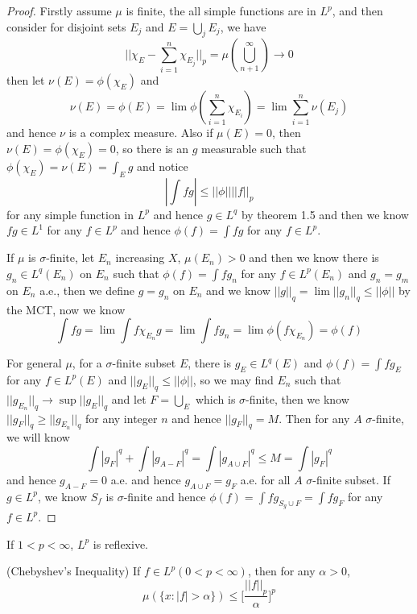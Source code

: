 \documentclass[lang=en, color=blue, ]{elegantbook}
\begin{document}
\begin{proof}\par
    Firstly assume $\mu$ is finite, the all simple functions are in $L^p$, and then consider for disjoint sets $E_j$ and $E = \bigcup_j E_j$, we have
    \[
    ||\chi_E - \sum\limits_{i=1}^n\chi_{E_j}||_p = \mu(\bigcup_{n+1}^{\infty}) \to 0
    \]
    then let $\nu(E) = \phi(\chi_E)$ and
    \[\nu(E) = \phi(E) = \lim \phi(\sum\limits_{i=1}^n \chi_{E_i}) = \lim \sum\limits_{i=1}^n \nu(E_j)\]
    and hence $\nu$ is a complex measure. Also if $\mu(E) = 0$, then $\nu(E) = \phi(\chi_E) = 0$, so there is an $g$ measurable such that $\phi(\chi_E) = \nu(E) = \int_E g$ and notice
    \[
    |\int fg| \leq ||\phi||||f||_p
    \]
    for any simple function in $L^p$ and hence $g\in L^q$ by theorem 1.5 and then we know $fg \in L^1$ for any $f\in L^p$ and hence $\phi(f) = \int fg$ for any $f\in L^p$.\par
    If $\mu$ is $\sigma$-finite, let $E_n$ increasing $X$, $\mu(E_n) > 0$ and then we know there is $g_n \in L^q(E_n)$ on $E_n$ such that $\phi(f) = \int fg_n$ for any $f\in L^p(E_n)$ and $g_n = g_m$ on $E_n$ a.e., then we define $g= g_n$ on $E_n$ and we know $||g||_q = \lim ||g_n||_q \leq ||\phi||$ by the MCT, now we know
    \[
    \int fg = \lim \int f\chi_{E_n}g = \lim \int fg_n = \lim \phi(f\chi_{E_n}) = \phi(f)
    \]\par
    For general $\mu$, for a $\sigma$-finite subset $E$, there is $g_E\in L^q(E)$ and $\phi(f) = \int fg_E$ for any $f\in L^p(E)$ and $||g_E||_q \leq ||\phi||$, so we may find $E_n$ such that $||g_{E_n}||_q \to \sup||g_E||_q$ and let $F = \bigcup_E$ which is $\sigma$-finite, then we know $||g_F||_q \geq ||g_{E_n}||_q$ for any integer $n$ and hence $||g_F||_q = M$. Then for any $A$ $\sigma$-finite, we will know
    \[
    \int |g_F|^q + \int |g_{A-F}|^q = \int |g_{A\cup F}|^q \leq M = \int |g_F|^q
    \]
    and hence $g_{A-F} = 0$ a.e. and hence $g_{A\cup F} = g_F$ a.e. for all $A$ $\sigma$-finite subset. If $g\in L^p$, we know $S_f$ is $\sigma$-finite and hence $\phi(f) = \int fg_{S_g\cup F} = \int f g_F$ for any $f\in L^p$.
\end{proof}

\begin{corollary}
    If $1 < p < \infty$, $L^p$ is reflexive.
\end{corollary}

\begin{theorem}
    (Chebyshev's Inequality) If $f\in L^p(0<p<\infty)$, then for any $\alpha > 0$,
    \[\mu(\{x:|f|>\alpha\}) \leq \Big[\dfrac{||f||_p}{\alpha}\Big]^p\]
\end{theorem}
\end{document}
